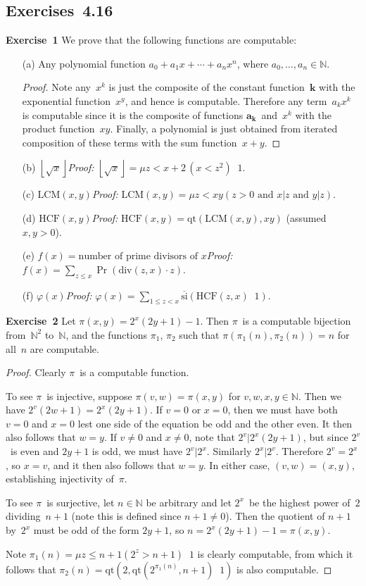 \documentclass[letterpaper]{article}
\newcommand{\exercise}[2][]{\noindent\textbf{Exercise~{#2}}\ifthenelse{\isempty{#1}}{\textbf{.}}{ ({#1})\textbf{.}}}
\newcommand{\N}{\mathbb{N}}
\newcommand{\tminus}{\mathop{\overset{.}{-}}}
\newcommand{\si}{\mathrm{si}}
\newcommand{\sic}{\overline{\si}}
\newcommand{\qt}{\mathrm{qt}}
\renewcommand{\div}{\mathrm{div}}
\newcommand{\lcm}{\mathrm{LCM}}
\newcommand{\hcf}{\mathrm{HCF}}
\newcommand{\floor}[1]{\left\lfloor{#1}\right\rfloor}
\theoremstyle{plain}
\theoremstyle{definition}
\theoremstyle{remark}
\begin{document}
\subsection*{Exercises~4.16}
\exercise{1}
We prove that the following functions are computable:
\begin{enumerate}[itemsep=0pt]
\item[(a)] Any polynomial function $a_0+a_1x+\cdots+a_nx^n$, where $a_0,\ldots,a_n\in\N$.
\begin{proof}Note any~$x^k$ is just the composite of the constant function~$\mathbf{k}$ with the exponential function~$x^y$, and hence is computable. Therefore any term~$a_kx^k$ is computable since it is the composite of functions $\mathbf{a_k}$~and~$x^k$ with the product function~$xy$. Finally, a polynomial is just obtained from iterated composition of these terms with the sum function~$x+y$.
\end{proof}
\item[(b)] $\floor{\sqrt{x}}$\quad\emph{Proof:} $\floor{\sqrt{x}}=\mu z<x+2\,(x<z^2)\tminus 1$.
\item[(c)] $\lcm(x,y)$\quad\emph{Proof:} $\lcm(x,y)=\mu z<xy(z>0\text{ and }x|z\text{ and }y|z)$.
\item[(d)] $\hcf(x,y)$\quad\emph{Proof:} $\hcf(x,y)=\qt(\lcm(x,y),xy)$ (assumed $x,y>0$).
\item[(e)] $f(x)=\text{number of prime divisors of }x$\quad\emph{Proof:} $f(x)=\sum_{z\le x}\Pr(\div(z,x)\cdot z)$.
\item[(f)] $\varphi(x)$\quad\emph{Proof:} $\varphi(x)=\sum_{1\le z<x}\sic(\hcf(z,x)\tminus 1)$.
\end{enumerate}

\exercise{2}
Let $\pi(x,y)=2^x(2y+1)-1$. Then $\pi$~is a computable bijection from~$\N^2$ to~$\N$, and the functions $\pi_1$, $\pi_2$ such that $\pi(\pi_1(n),\pi_2(n))=n$ for all~$n$ are computable.
\begin{proof}
Clearly $\pi$~is a computable function.

To see $\pi$~is injective, suppose $\pi(v,w)=\pi(x,y)$ for $v,w,x,y\in\N$. Then we have $2^v(2w+1)=2^x(2y+1)$. If $v=0$ or $x=0$, then we must have both $v=0$ and $x=0$ lest one side of the equation be odd and the other even. It then also follows that $w=y$. If $v\ne0$ and $x\ne0$, note that $2^v|2^x(2y+1)$, but since $2^v$~is even and $2y+1$ is odd, we must have $2^v|2^x$. Similarly $2^x|2^v$. Therefore $2^v=2^x$, so $x=v$, and it then also follows that $w=y$. In either case, $(v,w)=(x,y)$, establishing injectivity of~$\pi$.

To see $\pi$~is surjective, let $n\in\N$ be arbitrary and let $2^x$~be the highest power of~$2$ dividing~$n+1$ (note this is defined since $n+1\ne0$). Then the quotient of $n+1$ by~$2^x$ must be odd of the form $2y+1$, so $n=2^x(2y+1)-1=\pi(x,y)$.

Note $\pi_1(n)=\mu z\le n+1(2^z>n+1)\tminus 1$ is clearly computable, from which it follows that $\pi_2(n)=\qt(2,\qt(2^{\pi_1(n)},n+1)\tminus 1)$ is also computable.
\end{proof}
\end{document}

